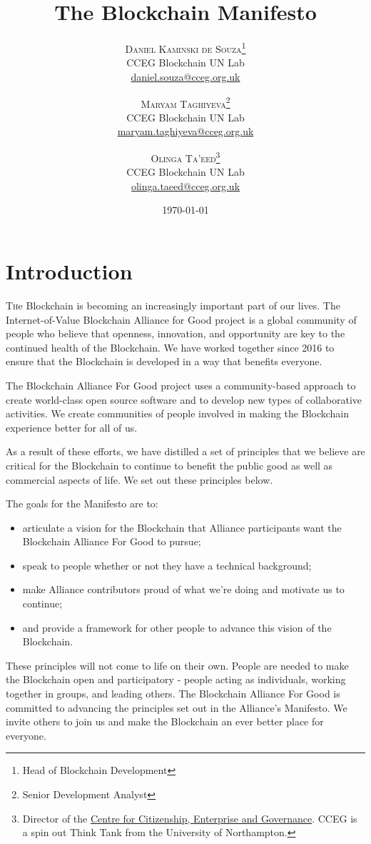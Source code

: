 \documentclass[twoside,twocolumn]{article}
\title{The Blockchain Manifesto} %
\author{%
\textsc{Daniel Kaminski de Souza}\thanks{Head of Blockchain Development} \\[1ex] %
\normalsize CCEG Blockchain UN Lab \\ %
\normalsize
\href{mailto:daniel.souza@cceg.org.uk}{daniel.souza@cceg.org.uk}
\and %
\textsc{Maryam Taghiyeva}\thanks{Senior Development Analyst} \\[1ex] %
\normalsize CCEG Blockchain UN Lab \\ %
\normalsize \href{mailto:maryam.taghiyeva@cceg.org.uk}{maryam.taghiyeva@cceg.org.uk}
\and %
\textsc{Olinga Ta'eed}\thanks{Director of the \href{www.cceg.org.uk}{Centre for
Citizenship, Enterprise and Governance}. CCEG is a spin out Think Tank from the University of
Northampton.} \\[1ex] %
\normalsize CCEG Blockchain UN Lab \\ %
\normalsize \href{mailto:olinga.taeed@cceg.org.uk}{olinga.taeed@cceg.org.uk} %
}
\date{\today} %
\begin{document}
\maketitle


\section{Introduction}

\lettrine[nindent=0em,lines=3]{T}he Blockchain is becoming an increasingly
important part of our lives. The Internet-of-Value Blockchain Alliance for Good
project is a global community of people who believe that openness, innovation,
and opportunity are key to the continued health of the Blockchain. We have
worked together since 2016 to ensure that the Blockchain is developed in a way
that benefits everyone.

The Blockchain Alliance For Good project uses a community-based approach to
create world-class open source software and to develop new types of
collaborative activities. We create communities of people involved in making the
Blockchain experience better for all of us.

As a result of these efforts, we have distilled a set of principles that we
believe are critical for the Blockchain to continue to benefit the public good
as well as commercial aspects of life. We set out these principles below.

The goals for the Manifesto are to:

\begin{itemize}
  \item articulate a vision for the Blockchain that Alliance participants want
  the Blockchain Alliance For Good to pursue;
  \item speak to people whether or not they have a technical
background;
  \item make Alliance contributors proud of what we're doing and motivate us
to continue;
  \item and provide a framework for other people to advance this vision of
the Blockchain.
\end{itemize}

These principles will not come to life on their own. People are needed to make
the Blockchain open and participatory - people acting as individuals, working
together in groups, and leading others. The Blockchain Alliance For Good is
committed to advancing the principles set out in the Alliance's Manifesto. We
invite others to join us and make the Blockchain an ever better place for
everyone.
\end{document}
